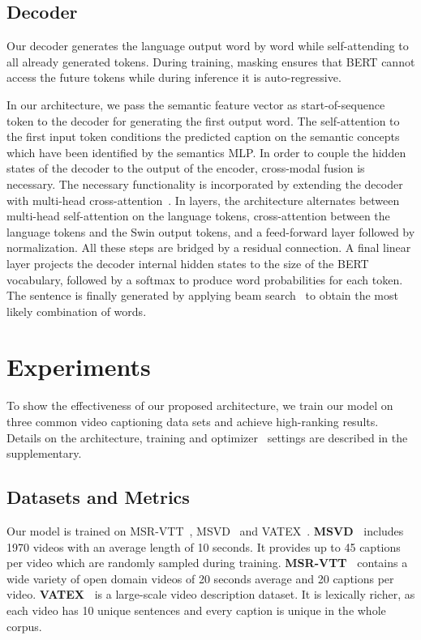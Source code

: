 \documentclass[runningheads,table]{llncs}
\begin{document}
\subsection{Decoder}
Our decoder generates the language output word by word while self-attending to all already generated tokens. During training, masking ensures that BERT cannot access the future tokens while during inference it is auto-regressive. 

In our architecture, we pass the semantic feature vector as start-of-sequence token to the decoder for generating the first output word. The self-attention to the first input token conditions the predicted caption on the semantic concepts which have been identified by the semantics MLP.
In order to couple the hidden states of the decoder to the output of the encoder, cross-modal fusion is necessary. The necessary functionality is incorporated by extending the decoder with multi-head cross-attention~\cite{vaswani2017attention}. In  layers, the architecture alternates between multi-head self-attention on the language tokens, cross-attention between the language tokens and the Swin output tokens, and a feed-forward layer followed by normalization. All these steps are bridged by a residual connection. 
A final linear layer projects the decoder internal hidden states to the size of the BERT vocabulary, followed by a softmax to produce word probabilities for each token. The sentence is finally generated by applying beam search~\cite{reddy1977speech} to obtain the most likely combination of words. 

 
\section{Experiments}
To show the effectiveness of our proposed architecture, we train our model on three common video captioning data sets and achieve high-ranking results.
Details on the architecture, training and optimizer~\cite{loshchilov2017decoupled} settings are described in the supplementary.


\subsection{Datasets and Metrics}
Our model is trained on MSR-VTT~\cite{xu2016msr}, MSVD~\cite{chen2011collecting} and VATEX~\cite{wang2019vatex}.
\textbf{MSVD~\cite{chen2011collecting}} includes 1970 videos with an average length of 10 seconds. It provides up to 45 captions per video which are randomly sampled during training.  
\textbf{MSR-VTT~\cite{xu2016msr}}
contains a wide variety of open domain videos of 20 seconds average and 20 captions per video. 
\textbf{VATEX~\cite{wang2019vatex}}
is a large-scale video description dataset.
It is lexically richer, as each video has 10 unique sentences and every caption is unique in the whole corpus.
\end{document}
